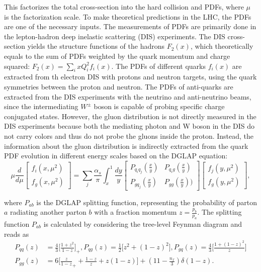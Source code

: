 \noindent This factorizes the total cross-section into the hard collision and PDFs, where $\mu$ is the factorization scale. To make theoretical predictions in the LHC, the PDFs are one of the necessary inputs. The measurements of PDFs are primarily done in the lepton-hadron deep inelastic scattering (DIS) experiments. The DIS cross-section yields the structure functions of the hadrons $F_2(x)$, which theoretically equals to the sum of PDFs weighted by the quark momentum and charge squared: $F_2(x) = \sum_i x Q^2_i f_i(x)$. The PDFs of different quarks $f_i(x)$ are extracted from th electron DIS with protons and neutron targets, using the quark symmetries between the proton and neutron. The PDFs of anti-quarks are extracted from the DIS experiments with the neutrino and anti-neutrino beams, since the intermediating $W^\pm$ boson is capable of probing specific charge conjugated states. However, the gluon distribution is not directly measured in the DIS experiments because both the mediating photon and W boson in the DIS do not carry colors and thus do not probe the gluons inside the proton. Instead, the information about the gluon distribution is indirectly extracted from the quark PDF evolution in different energy scales based on the DGLAP equation:
\begin{equation}
    \mu \frac{d}{d\mu} \begin{bmatrix} f_i(x,\mu^2) \\ f_g(x,\mu^2) \end{bmatrix} = 
    \sum_j \frac{\alpha_s}{\pi} \int_x^1 
    \frac{dy}{y}
    \begin{bmatrix} P_{q_i q_j}(\frac{x}{y}) & P_{q_i g}(\frac{x}{y}) \\ P_{g q_j}(\frac{x}{y}) & P_{gg}(\frac{x}{y})) \end{bmatrix} \begin{bmatrix} f_j(y,\mu^2) \\ f_g(y, \mu^2) \end{bmatrix} ,
    \label{eqn:relatedWorks:qft:ppCollision:dglap}
\end{equation}

\noindent where $P_{ab}$ is the DGLAP splitting function, representing the probability of parton $a$ radiating another parton $b$ with a fraction momentum $z=\frac{p_b}{p_a}$. The splitting  function $P_{ab}$ is calculated by considering the tree-level Feynman diagram and reads as
\begin{equation}
\begin{split}
	P_{qq}(z) &= \frac{4}{3}\bigg[\frac{1+z^2}{1-z} \bigg]_+, P_{qg}(z)=\frac{1}{2} \bigg[z^2+(1-z)^2 \bigg], P_{gq}(z)=\frac{4}{3}\bigg[\frac{1+(1-z)^2}{z} \bigg]\\
    P_{gg}(z) &= 6 \bigg[ \frac{z}{1-z}_+ + \frac{1-z}{z} + z(1-z) \bigg] +(11-\frac{n_f}{3})\delta(1-z) .
\end{split}
\label{eqn:relatedWorks:qft:ppCollision:splitting}
\end{equation}

